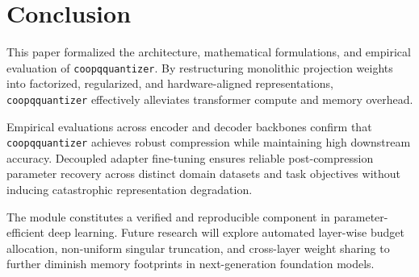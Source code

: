 \section{Conclusion}
This paper formalized the architecture, mathematical formulations, and empirical evaluation of \texttt{coopqquantizer}. By restructuring monolithic projection weights into factorized, regularized, and hardware-aligned representations, \texttt{coopqquantizer} effectively alleviates transformer compute and memory overhead.

Empirical evaluations across encoder and decoder backbones confirm that \texttt{coopqquantizer} achieves robust compression while maintaining high downstream accuracy. Decoupled adapter fine-tuning ensures reliable post-compression parameter recovery across distinct domain datasets and task objectives without inducing catastrophic representation degradation.

The module constitutes a verified and reproducible component in parameter-efficient deep learning. Future research will explore automated layer-wise budget allocation, non-uniform singular truncation, and cross-layer weight sharing to further diminish memory footprints in next-generation foundation models.
